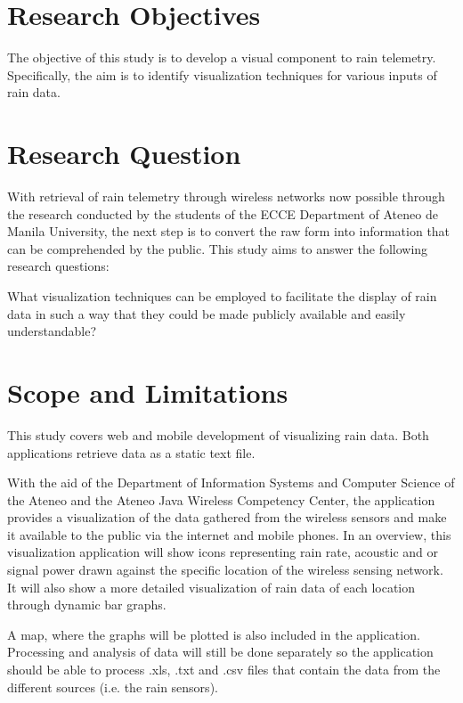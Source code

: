 \section{Research Objectives}

The objective of this study is to develop a visual component to rain telemetry. Specifically, the aim is to identify visualization techniques for various inputs of rain data.

\section{Research Question}

With retrieval of rain telemetry through wireless networks now possible through the research conducted by the students of the ECCE Department of Ateneo de Manila University, the next step is to convert the raw form into information that can be comprehended by the public. This study aims to answer the following research questions:

\bigskip
What visualization techniques can be employed to facilitate the display of rain data in such a way that they could be made publicly available and easily understandable?

\section{Scope and Limitations}

This study covers web and mobile development of visualizing rain data. Both applications retrieve data as a static text file.

\bigskip
With the aid of the Department of Information Systems and Computer Science of the Ateneo and the Ateneo Java Wireless Competency Center, the application provides a visualization of the data gathered from the wireless sensors and make it available to the public via the internet and mobile phones. In an overview, this visualization application will show icons representing rain rate, acoustic and or signal power drawn against the specific location of the wireless sensing network. It will also show a more detailed visualization of rain data of each location through dynamic bar graphs. 

\bigskip
A map, where the graphs will be plotted is also included in the application. Processing and analysis of data will still be done separately so the application should be able to process .xls, .txt and .csv files that contain the data from the different sources (i.e. the rain sensors). 

